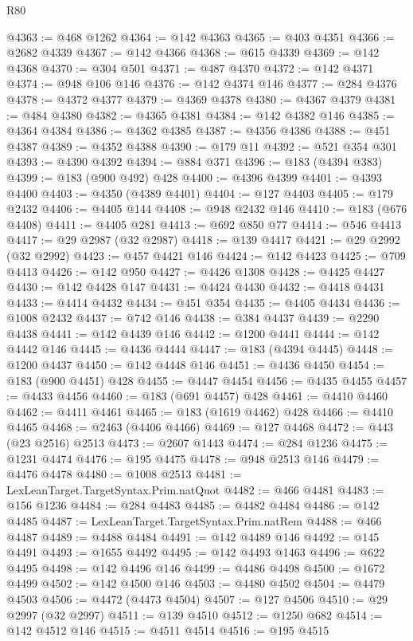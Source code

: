 \begin{lexlean}{R80}
\begin{coremodule}
@4363 := @468 @1262
@4364 := @142 @4363
@4365 := @403 @4351
@4366 := @2682 @4339
@4367 := @142 @4366
@4368 := @615 @4339
@4369 := @142 @4368
@4370 := @304 @501
@4371 := @487 @4370
@4372 := @142 @4371
@4374 := @948 @106 @146
@4376 := @142 @4374 @146
@4377 := @284 @4376
@4378 := @4372 @4377
@4379 := @4369 @4378
@4380 := @4367 @4379
@4381 := @484 @4380
@4382 := @4365 @4381
@4384 := @142 @4382 @146
@4385 := @4364 @4384
@4386 := @4362 @4385
@4387 := @4356 @4386
@4388 := @451 @4387
@4389 := @4352 @4388
@4390 := @179 @11
@4392 := @521 @354 @301
@4393 := @4390 @4392
@4394 := @884 @371
@4396 := @183 (@4394 @383)
@4399 := @183 (@900 @492) @428
@4400 := @4396 @4399
@4401 := @4393 @4400
@4403 := @4350 (@4389 @4401)
@4404 := @127 @4403
@4405 := @179 @2432
@4406 := @4405 @144
@4408 := @948 @2432 @146
@4410 := @183 (@676 @4408)
@4411 := @4405 @281
@4413 := @692 @850 @77
@4414 := @546 @4413
@4417 := @29 @2987 (@32 @2987)
@4418 := @139 @4417
@4421 := @29 @2992 (@32 @2992)
@4423 := @457 @4421 @146
@4424 := @142 @4423
@4425 := @709 @4413
@4426 := @142 @950
@4427 := @4426 @1308
@4428 := @4425 @4427
@4430 := @142 @4428 @147
@4431 := @4424 @4430
@4432 := @4418 @4431
@4433 := @4414 @4432
@4434 := @451 @354
@4435 := @4405 @4434
@4436 := @1008 @2432
@4437 := @742 @146
@4438 := @384 @4437
@4439 := @2290 @4438
@4441 := @142 @4439 @146
@4442 := @1200 @4441
@4444 := @142 @4442 @146
@4445 := @4436 @4444
@4447 := @183 (@4394 @4445)
@4448 := @1200 @4437
@4450 := @142 @4448 @146
@4451 := @4436 @4450
@4454 := @183 (@900 @4451) @428
@4455 := @4447 @4454
@4456 := @4435 @4455
@4457 := @4433 @4456
@4460 := @183 (@691 @4457) @428
@4461 := @4410 @4460
@4462 := @4411 @4461
@4465 := @183 (@1619 @4462) @428
@4466 := @4410 @4465
@4468 := @2463 (@4406 @4466)
@4469 := @127 @4468
@4472 := @443 (@23 @2516) @2513
@4473 := @2607 @1443
@4474 := @284 @1236
@4475 := @1231 @4474
@4476 := @195 @4475
@4478 := @948 @2513 @146
@4479 := @4476 @4478
@4480 := @1008 @2513
@4481 := LexLeanTarget.TargetSyntax.Prim.natQuot
@4482 := @466 @4481
@4483 := @156 @1236
@4484 := @284 @4483
@4485 := @4482 @4484
@4486 := @142 @4485
@4487 := LexLeanTarget.TargetSyntax.Prim.natRem
@4488 := @466 @4487
@4489 := @4488 @4484
@4491 := @142 @4489 @146
@4492 := @145 @4491
@4493 := @1655 @4492
@4495 := @142 @4493 @1463
@4496 := @622 @4495
@4498 := @142 @4496 @146
@4499 := @4486 @4498
@4500 := @1672 @4499
@4502 := @142 @4500 @146
@4503 := @4480 @4502
@4504 := @4479 @4503
@4506 := @4472 (@4473 @4504)
@4507 := @127 @4506
@4510 := @29 @2997 (@32 @2997)
@4511 := @139 @4510
@4512 := @1250 @682
@4514 := @142 @4512 @146
@4515 := @4511 @4514
@4516 := @195 @4515

\end{coremodule}
\end{lexlean}
